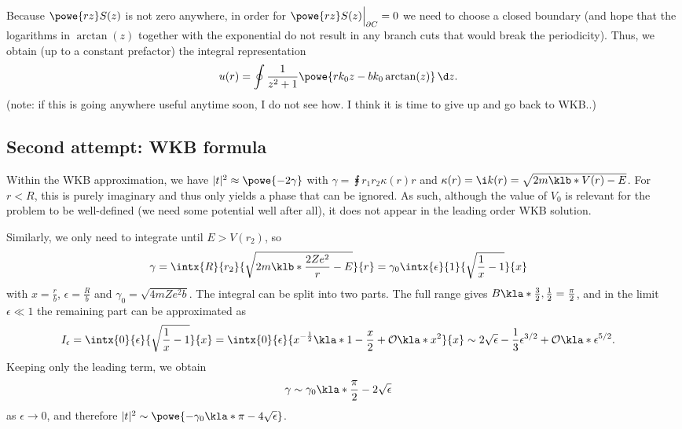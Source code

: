 \documentclass[english, parskip=full]{scrartcl}
\begin{document}
Because $\powe{rz}S(z)$ is not zero anywhere, in order for $\powe{rz} S(z)\Big\vert_{\partial C}=0$ we need to choose a closed boundary (and hope that the logarithms in $\arctan(z)$ together with the exponential do not result in any branch cuts that would break the periodicity).
Thus, we obtain (up to a constant prefactor) the integral representation
\begin{align}
u(r) &= \oint \frac{1}{z^2+1} \powe{rk_0 z - bk_0\arctan(z)}\,\d z.
\end{align}
(note: if this is going anywhere useful anytime soon, I do not see how. I think it is time to give up and go back to WKB..)
\subsection{Second attempt: WKB formula}
Within the WKB approximation, we have $|t|^2 \approx \powe{-2\gamma}$ with $\gamma = \intx{r_1}{r_2}{\kappa(r)}{r}$ and $\kappa(r)=\i k(r) = \sqrt{2m\klb*{V(r)-E}}$.
For $r<R$, this is purely imaginary and thus only yields a phase that can be ignored.
As such, although the value of $V_0$ is relevant for the problem to be well-defined (we need some potential well after all), it does not appear in the leading order WKB solution.

Similarly, we only need to integrate until $E>V(r_2)$, so
\begin{align}
\gamma &= \intx{R}{r_2}{\sqrt{2m \klb*{\frac{2Ze^2}{r} - E}}}{r} = \gamma_0 \intx{\epsilon}{1}{\sqrt{\frac{1}{x} - 1}}{x}
\end{align}
with $x=\frac{r}{b}$, $\epsilon=\frac{R}{b}$ and $\gamma_0 = \sqrt{4mZe^2b}$.
The integral can be split into two parts.
The full range gives $B\kla*{\frac{3}{2},\frac{1}{2}} = \frac{\pi}{2}$, and in the limit $\epsilon\ll 1$ the remaining part can be approximated as
\begin{align}
I_\epsilon &= \intx{0}{\epsilon}{\sqrt{\frac{1}{x} - 1}}{x} = \intx{0}{\epsilon}{ x^{-\frac{1}{2}} \kla*{1 - \frac{x}{2} + \mathcal{O}\kla*{x^2}} }{x} \sim 2\sqrt{\epsilon} - \frac{1}{3}\epsilon^{3/2} + \mathcal{O}\kla*{\epsilon^{5/2}}.
\end{align}
Keeping only the leading term, we obtain
\begin{align}
\gamma &\sim \gamma_0 \kla*{\frac{\pi}{2} - 2\sqrt{\epsilon}}
\end{align}
as $\epsilon\rightarrow 0$, and therefore $|t|^2 \sim \powe{-\gamma_0 \kla*{\pi - 4\sqrt{\epsilon}}}$.
\end{document}

